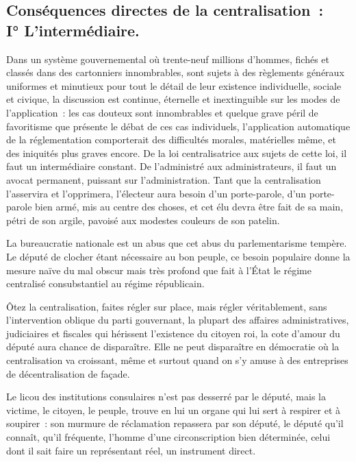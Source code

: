 \documentclass[french,twoside]{book} %
\begin{document}
\subsection[{Conséquences directes de la centralisation : I° L’intermédiaire.}]{Conséquences directes de la centralisation : \\
I° L’intermédiaire.}
\noindent Dans un système gouvernemental où trente-neuf millions d’hommes, fichés et classés dans des cartonniers innombrables, sont sujets à des règlements généraux uniformes et minutieux pour tout le détail de leur existence individuelle, sociale et civique, la discussion est continue, éternelle et inextinguible sur les modes de l’application : les cas douteux sont innombrables et quelque grave péril de favoritisme que présente le débat de ces cas individuels, l’application automatique de la réglementation comporterait des difficultés morales, matérielles même, et des iniquités plus graves encore. De la loi centralisatrice aux sujets de cette loi, il faut un intermédiaire constant. De l’administré aux administrateurs, il faut un avocat permanent, puissant sur l’administration. Tant que la centralisation l’asservira et l’opprimera, l’électeur aura besoin d’un porte-parole, d’un porte-parole bien armé, mis au centre des choses, et cet élu devra être fait de sa main, pétri de son argile, pavoisé aux modestes couleurs de son patelin.\par
La bureaucratie nationale est un abus que cet abus du parlementarisme tempère. Le député de clocher étant nécessaire au bon peuple, ce besoin populaire donne la mesure naïve du mal obscur mais très profond que fait à l’État le régime centralisé consubstantiel au régime républicain.\par
Ôtez la centralisation, faites régler sur place, mais régler véritablement, sans l’intervention oblique du parti gouvernant, la plupart des affaires administratives, judiciaires et fiscales qui hérissent l’existence du citoyen roi, la cote d’amour du député aura chance de disparaître. Elle ne peut disparaître en démocratie où la centralisation va croissant, même et surtout quand on s’y amuse à des entreprises de décentralisation de façade.\par
Le licou des institutions consulaires n’est pas desserré par le député, mais la victime, le citoyen, le peuple, trouve en lui un organe qui lui sert à respirer et à soupirer : son murmure de réclamation repassera par son député, le député qu’il connaît, qu’il fréquente, l’homme d’une circonscription bien déterminée, celui dont il sait faire un représentant réel, un instrument direct.\par
\end{document}
